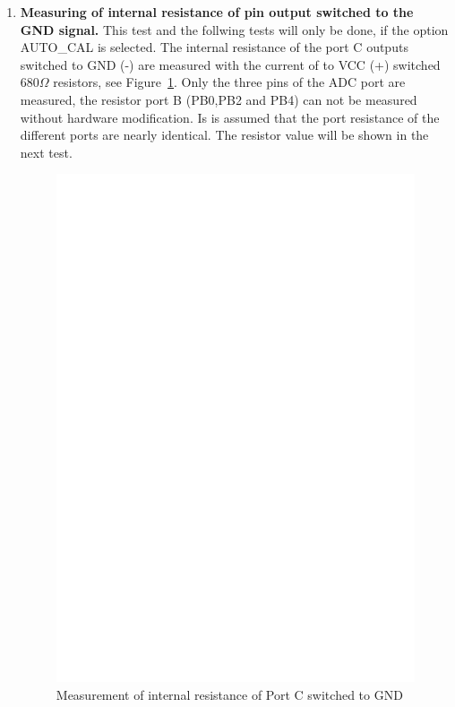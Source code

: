 \begin{enumerate}
\item {\bf Measuring of internal resistance of pin output switched to the GND signal.}
This test and the follwing tests will only be done, if the option AUTO\_CAL is selected.
The internal resistance of the port C outputs switched to GND (-) are measured with the current
of to VCC (+) switched \(680\Omega\) resistors, see Figure~\ref{fig:test7}.
Only the three pins of the ADC port are measured, the resistor port B (PB0,PB2 and PB4) can not be measured
without hardware modification.
Is is assumed that the port resistance of the different ports are nearly identical.
The resistor value will be shown in the next test.
\begin{figure}[H]
\centering
\includegraphics[]{../FIG/Test7.eps}
\caption{Measurement of internal resistance of Port C switched to GND }
\label{fig:test7}
\end{figure}


\end{enumerate}
